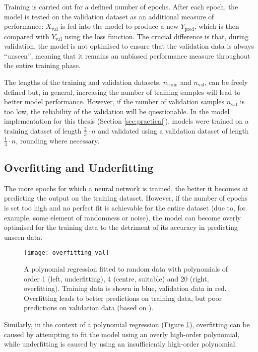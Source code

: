 Training is carried out for a defined number of epochs. After each epoch, the model is tested on the validation dataset as an additional measure of performance: \(X_{\text{val}}\) is fed into the model to produce a new \(Y_{\text{pred}}\), which is then compared with \(Y_{\text{val}}\) using the loss function. The crucial difference is that, during validation, the model is not optimised to ensure that the validation data is always ``unseen'', meaning that it remains an unbiased performance measure throughout the entire training phase.

The lengths of the training and validation datasets, \(n_{\text{train}}\) and \(n_{\text{val}}\), can be freely defined but, in general, increasing the number of training samples will lead to better model performance. However, if the number of validation samples \(n_{\text{val}}\) is too low, the reliability of the validation will be questionable. In the model implementation for this thesis (Section \ref{sec:practical}), models were trained on a training dataset of length \(\frac{2}{3} \cdot n\) and validated using a validation dataset of length \(\frac{1}{3} \cdot n\), rounding where necessary.

\subsection{Overfitting and Underfitting}
The more epochs for which a neural network is trained, the better it becomes at predicting the output on the training dataset. However, if the number of epochs is set too high and no perfect fit is achievable for the entire dataset (due to, for example, some element of randomness or noise), the model can become overly optimised for the training data to the detriment of its accuracy in predicting unseen data.

\begin{figure}
    \centering
    \texttt{[image: overfitting\_val]}
    \caption{\label{fig:overfitting} A polynomial regression fitted to random data with polynomials of order 1 (left, underfitting), 4 (centre, suitable) and 20 (right, overfitting). Training data is shown in blue, validation data in red. Overfitting leads to better predictions on training data, but poor predictions on validation data (based on \protect\citet{vanderplas_python_2016}).}
\end{figure}

Similarly, in the context of a polynomial regression (Figure \ref{fig:overfitting}), overfitting can be caused by attempting to fit the model using an overly high-order polynomial, while underfitting is caused by using an insufficiently high-order polynomial. \cite[p. 365]{vanderplas_python_2016}

